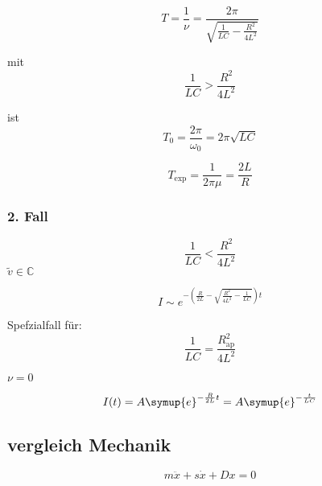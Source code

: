        \begin{equation}
            T = \frac{1}{\nu} = \frac{2 \pi}{\sqrt{\frac{1}{LC}-\frac{R^2}{4L^2}}}
        \end{equation}

        mit 
        \begin{equation}
            \frac{1}{LC} > \frac{R^2}{4L^2}
        \end{equation}

        ist
        \begin{equation}
            T_0 = \frac{2\pi}{\omega_0} = 2\pi \sqrt{LC}
        \end{equation}

        \begin{equation}
            T_{\text{exp}} = \frac{1}{2 \pi \mu } = \frac{2L}{R}
        \end{equation}

        \subsubsection{2. Fall}

        \begin{equation}
            \frac{1}{LC} < \frac{R^2}{4L^2}
        \end{equation}
        $\tilde{v} \in \mathds{C}$

        \begin{equation}
            I \sim e^{- \left( \frac{R}{2L} - \sqrt{\frac{R^2}{4L^2} - \frac{1}{LC}}\right) t}
        \end{equation}

        Spefzialfall für:
        \begin{equation}
            \frac{1}{LC} = \frac{R^2_{\text{ap}}}{4L^2}
        \end{equation}

        $\nu = 0$

        \begin{equation}
            I(t) = A \symup{e}^{-\frac{R}{2L}t} = A \symup{e}^{-\frac{t}{LC}}
        \end{equation}

        \subsection{vergleich Mechanik}

        \begin{equation}
            m \ddot{x} + s \dot{x} + Dx = 0
        \end{equation}

